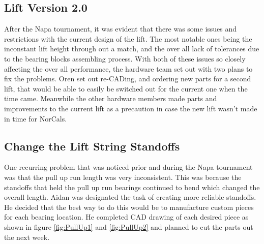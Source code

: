 \documentclass{article}
\begin{document}
\subsection{Lift Version 2.0}
After the Napa tournament, it was evident that there was some issues and restrictions with the current design of the lift. The most notable ones being the inconstant lift height through out a match, and the over all lack of tolerances due to the bearing blocks assembling process. With both of these issues so closely affecting the over all performance, the hardware team set out with two plans to fix the problems. Oren set out re-CADing, and ordering new parts for a second lift, that would be able to easily be switched out for the current one when the time came. Meanwhile the other hardware members made parts and improvements to the current lift as a precaution in case the new lift wasn't made in time for NorCals. 


\subsection{Change the Lift String Standoffs}
One recurring problem that was noticed prior and during the Napa tournament was that the pull up run length was very inconsistent. This was because the standoffs that held the pull up run bearings continued to bend which changed the overall length. Aidan was designated the task of creating more reliable standoffs. He decided that the best way to do this would be to manufacture custom pieces for each bearing location. He completed CAD drawing of each desired piece as shown in figure \ref{fig:PullUp1} and \ref{fig:PullUp2} and planned to cut the parts out the next week.
\end{document}
